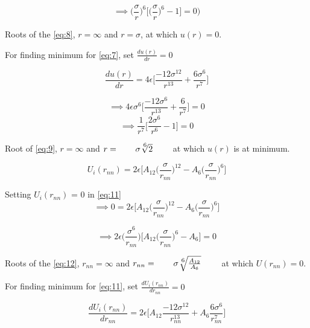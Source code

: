 \documentclass{article}
\begin{document}
\begin{equation}
\implies \big(\frac{\sigma}{r}\big)^6\Big[\big(\frac{\sigma}{r}\big)^6-1\Big] = 0 \label{eq:8})
\end{equation}

Roots of the \eqref{eq:8}, \underline{$r = \infty$} and \underline{$r = \sigma$}, at which $u(r)=0$.

For finding minimum for \eqref{eq:7}, set $\frac{du(r)}{dr} = 0$

\begin{equation}
\frac{du(r)}{dr} = 4\epsilon\Big[ \frac{-12\sigma^{12}}{r^{13}} + \frac{6\sigma^6}{r^7} \Big]
\end{equation}

\begin{equation}
\implies 4\epsilon\sigma^6 \Big[ \frac{-12\sigma^6}{r^{13}} + \frac{6}{r^7} \Big] = 0 \label{eq:9}
\end{equation}
$$\implies \frac{1}{r^7} \Big[ \frac{2\sigma^6}{r^6} - 1 \Big] = 0 $$

Root of \eqref{eq:9}, $r=\infty$ and $r = \qquad \sigma\sqrt[\leftroot{-1}\uproot{2}\scriptstyle 6]2\qquad$ at which $u(r)$ is at minimum.

\begin{equation}
\boxed{U_i(r_{nn}) = 2\epsilon\Big[A_{12}\Big(\frac{\sigma}{r_{nn}}\Big)^{12} - A_6\Big(\frac{\sigma}{r_{nn}}\Big)^6\Big] \label{eq:10}}
\end{equation}

Setting $U_i(r_{nn})$ = 0 in \eqref{eq:11}
$$\implies 0 =
2\epsilon\Big[A_{12}\Big(\frac{\sigma}{r_{nn}}\Big)^{12}-A_6\Big(\frac{\sigma}{r_{nn}}\Big)^6\Big] $$

\begin{equation}
\implies 2\epsilon\Big(\frac{\sigma^6}{r_{nn}}\Big) \Big[A_{12}\Big(\frac{\sigma}{r_{nn}}\Big)^{6} - A_6\Big] = 0 \label{eq:11}
\end{equation}

Roots of the \eqref{eq:12}, $r_{nn} = \infty$ and
$r_{nn} = \qquad \sigma \sqrt[\leftroot{-1}\uproot{2}\scriptstyle 6]{\frac{A_{12}}{A_6}}\qquad$ at which $U(r_{nn})=0$.

\newline
For finding minimum for \eqref{eq:11}, set $\frac{dU_i(r_{nn})}{dr_{nn}} = 0$

\begin{equation}
\frac{dU_i(r_{nn})}{dr_{nn}} = 2\epsilon\Big[ A_{12}\frac{-12\sigma^{12}}{r_{nn}^{13}} + A_6\frac{6\sigma^6}{r_{nn}^7} \Big]
\end{equation}
\end{document}
